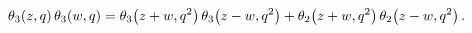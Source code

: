 \[\mathop{\theta_{3}\/}\nolimits\!\left(z,q\right)\mathop{\theta_{3}\/}\nolimits%
\!\left(w,q\right)=\mathop{\theta_{3}\/}\nolimits\!\left(z+w,q^{2}\right)%
\mathop{\theta_{3}\/}\nolimits\!\left(z-w,q^{2}\right)+\mathop{\theta_{2}\/}%
\nolimits\!\left(z+w,q^{2}\right)\mathop{\theta_{2}\/}\nolimits\!\left(z-w,q^{%
2}\right).\]
